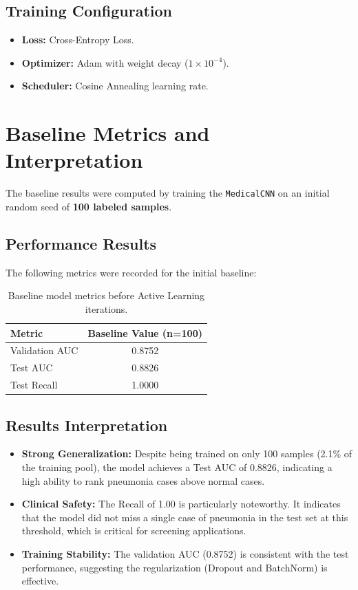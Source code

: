 \documentclass[a4paper,12pt]{article}
\begin{document}
\subsection{Training Configuration}
\begin{itemize}
    \item \textbf{Loss:} Cross-Entropy Loss.
    \item \textbf{Optimizer:} Adam with weight decay ($1\times 10^{-4}$).
    \item \textbf{Scheduler:} Cosine Annealing learning rate.
\end{itemize}

\newpage

\section{Baseline Metrics and Interpretation}
The baseline results were computed by training the \texttt{MedicalCNN} on an initial random seed of \textbf{100 labeled samples}.

\subsection{Performance Results}
The following metrics were recorded for the initial baseline:

\begin{table}[h]
\centering
\begin{tabular}{lc}
\toprule
\textbf{Metric} & \textbf{Baseline Value (n=100)} \\
\midrule
Validation AUC & 0.8752 \\
Test AUC & 0.8826 \\
Test Recall & 1.0000 \\
\bottomrule
\end{tabular}
\caption{Baseline model metrics before Active Learning iterations.}
\end{table}

\subsection{Results Interpretation}
\begin{itemize}
    \item \textbf{Strong Generalization:} Despite being trained on only 100 samples (2.1\% of the training pool), the model achieves a Test AUC of 0.8826, indicating a high ability to rank pneumonia cases above normal cases.
    \item \textbf{Clinical Safety:} The Recall of 1.00 is particularly noteworthy. It indicates that the model did not miss a single case of pneumonia in the test set at this threshold, which is critical for screening applications.
    \item \textbf{Training Stability:} The validation AUC (0.8752) is consistent with the test performance, suggesting the regularization (Dropout and BatchNorm) is effective.
\end{itemize}
\end{document}
